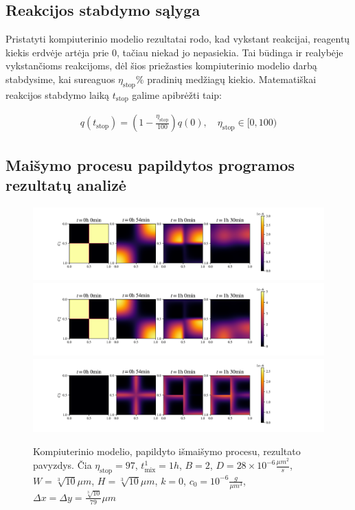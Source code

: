 
\subsection{Reakcijos stabdymo sąlyga}

Pristatyti kompiuterinio modelio rezultatai rodo, kad vykstant reakcijai, reagentų kiekis erdvėje artėja prie 0, tačiau niekad jo nepasiekia. Tai būdinga ir realybėje vykstančioms reakcijoms, dėl šios priežasties kompiuterinio modelio darbą stabdysime, kai sureaguos $\eta_\text{stop}\%$ pradinių medžiagų kiekio. Matematiškai reakcijos stabdymo laiką $t_\text{stop}$ galime apibrėžti taip:

\begin{align}
    q(t_\text{stop})=\left(1-\frac{\eta_\text{stop}}{100}\right)q(0),\quad \eta_\text{stop}\in[0, 100)
\end{align}

\newpage
\subsection{Maišymo procesu papildytos programos rezultatų analizė}

\begin{figure}[h!]
\centering
\caption{Kompiuterinio modelio, papildyto išmaišymo procesu, rezultato pavyzdys. Čia $\eta_\text{stop} = 97$, $t^1_\text{mix} = 1h$, $B = 2$, $D = 28\times 10^{-6} \frac{\mu m^2}{s}$, $W = \sqrt[3]{10}\mu m$, $H = \sqrt[3]{10}\mu m$, $k = 0$, $c_0 = 10^{-6} \frac{g}{\mu m^3}$, $\Delta x = \Delta y = \frac{\sqrt[3]{10}}{79} \mu m$ }
\includegraphics[width=\textwidth]{../paper/assets/random-mix-example-c0-1.png} \\
\includegraphics[width=\textwidth]{../paper/assets/random-mix-example-c1-1.png} \\
\includegraphics[width=\textwidth]{../paper/assets/random-mix-example-c2-1.png}
\label{mix-example}
\end{figure}

